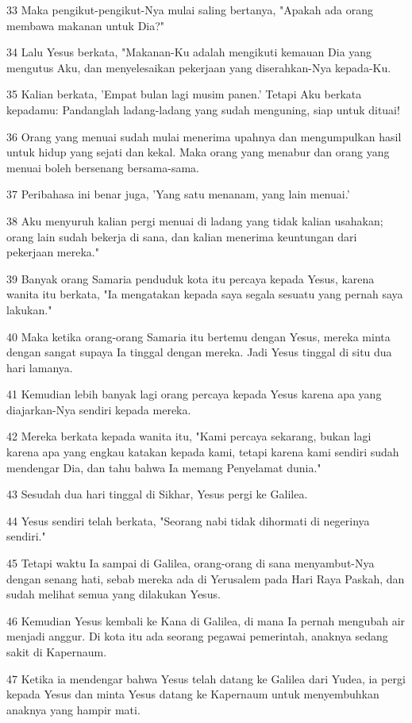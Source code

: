 \par 33 Maka pengikut-pengikut-Nya mulai saling bertanya, "Apakah ada orang membawa makanan untuk Dia?"
\par 34 Lalu Yesus berkata, "Makanan-Ku adalah mengikuti kemauan Dia yang mengutus Aku, dan menyelesaikan pekerjaan yang diserahkan-Nya kepada-Ku.
\par 35 Kalian berkata, 'Empat bulan lagi musim panen.' Tetapi Aku berkata kepadamu: Pandanglah ladang-ladang yang sudah menguning, siap untuk dituai!
\par 36 Orang yang menuai sudah mulai menerima upahnya dan mengumpulkan hasil untuk hidup yang sejati dan kekal. Maka orang yang menabur dan orang yang menuai boleh bersenang bersama-sama.
\par 37 Peribahasa ini benar juga, 'Yang satu menanam, yang lain menuai.'
\par 38 Aku menyuruh kalian pergi menuai di ladang yang tidak kalian usahakan; orang lain sudah bekerja di sana, dan kalian menerima keuntungan dari pekerjaan mereka."
\par 39 Banyak orang Samaria penduduk kota itu percaya kepada Yesus, karena wanita itu berkata, "Ia mengatakan kepada saya segala sesuatu yang pernah saya lakukan."
\par 40 Maka ketika orang-orang Samaria itu bertemu dengan Yesus, mereka minta dengan sangat supaya Ia tinggal dengan mereka. Jadi Yesus tinggal di situ dua hari lamanya.
\par 41 Kemudian lebih banyak lagi orang percaya kepada Yesus karena apa yang diajarkan-Nya sendiri kepada mereka.
\par 42 Mereka berkata kepada wanita itu, "Kami percaya sekarang, bukan lagi karena apa yang engkau katakan kepada kami, tetapi karena kami sendiri sudah mendengar Dia, dan tahu bahwa Ia memang Penyelamat dunia."
\par 43 Sesudah dua hari tinggal di Sikhar, Yesus pergi ke Galilea.
\par 44 Yesus sendiri telah berkata, "Seorang nabi tidak dihormati di negerinya sendiri."
\par 45 Tetapi waktu Ia sampai di Galilea, orang-orang di sana menyambut-Nya dengan senang hati, sebab mereka ada di Yerusalem pada Hari Raya Paskah, dan sudah melihat semua yang dilakukan Yesus.
\par 46 Kemudian Yesus kembali ke Kana di Galilea, di mana Ia pernah mengubah air menjadi anggur. Di kota itu ada seorang pegawai pemerintah, anaknya sedang sakit di Kapernaum.
\par 47 Ketika ia mendengar bahwa Yesus telah datang ke Galilea dari Yudea, ia pergi kepada Yesus dan minta Yesus datang ke Kapernaum untuk menyembuhkan anaknya yang hampir mati.
